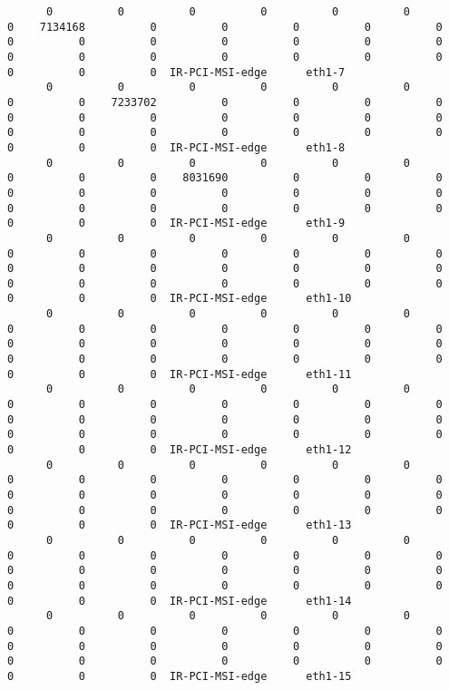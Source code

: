 \begin{lstlisting}
      0          0          0          0          0          0          0    7134168          0          0          0          0          0          0          0          0          0          0          0          0          0          0          0          0          0          0          0          0          0          0  IR-PCI-MSI-edge      eth1-7
      0          0          0          0          0          0          0          0    7233702          0          0          0          0          0          0          0          0          0          0          0          0          0          0          0          0          0          0          0          0          0  IR-PCI-MSI-edge      eth1-8
      0          0          0          0          0          0          0          0          0    8031690          0          0          0          0          0          0          0          0          0          0          0          0          0          0          0          0          0          0          0          0  IR-PCI-MSI-edge      eth1-9
      0          0          0          0          0          0          0          0          0          0          0          0          0          0          0          0          0          0          0          0          0          0          0          0          0          0          0          0          0          0  IR-PCI-MSI-edge      eth1-10
      0          0          0          0          0          0          0          0          0          0          0          0          0          0          0          0          0          0          0          0          0          0          0          0          0          0          0          0          0          0  IR-PCI-MSI-edge      eth1-11
      0          0          0          0          0          0          0          0          0          0          0          0          0          0          0          0          0          0          0          0          0          0          0          0          0          0          0          0          0          0  IR-PCI-MSI-edge      eth1-12
      0          0          0          0          0          0          0          0          0          0          0          0          0          0          0          0          0          0          0          0          0          0          0          0          0          0          0          0          0          0  IR-PCI-MSI-edge      eth1-13
      0          0          0          0          0          0          0          0          0          0          0          0          0          0          0          0          0          0          0          0          0          0          0          0          0          0          0          0          0          0  IR-PCI-MSI-edge      eth1-14
      0          0          0          0          0          0          0          0          0          0          0          0          0          0          0          0          0          0          0          0          0          0          0          0          0          0          0          0          0          0  IR-PCI-MSI-edge      eth1-15
\end{lstlisting}
